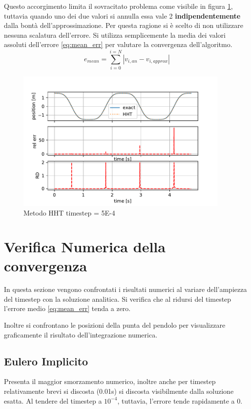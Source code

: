Questo accorgimento limita il sovracitato problema come visibile in figura \ref{fig:HHT_relerr}, tuttavia quando uno dei due valori si annulla essa vale 2 \textbf{indipendentemente} dalla bontà dell'approssimazione. Per questa ragione si è scelto di non utilizzare nessuna scalatura dell'errore. Si utilizza semplicemente la media dei valori assoluti dell'errore \ref{eq:mean_err} per valutare la convergenza dell'algoritmo.
\begin{equation}
    \label{eq:mean_err}
    e_{mean} = \sum_{i=0}^{i=N} |v_{i, an} - v_{i, approx}|
\end{equation}

\begin{figure}[h!]
\centering
\includegraphics[height=7cm]{Figure/HHT_relerr.pdf}
\caption{Metodo HHT timestep = 5E-4}
 \label{fig:HHT_relerr}
\end{figure}

\section{Verifica Numerica della convergenza}
In questa sezione vengono confrontati i risultati numerici al variare dell'ampiezza del timestep con la soluzione analitica. Si verifica che al ridursi del timestep l'errore medio \ref{eq:mean_err} tenda a zero.

Inoltre si confrontano le posizioni della punta del pendolo per visualizzare graficamente il risultato dell'integrazione numerica.
\subsection{Eulero Implicito}
Presenta il maggior smorzamento numerico, inoltre anche per timestep relativamente brevi si discosta (0.01s) si discosta visibilmente dalla soluzione esatta. 
Al tendere del timestep a $10^{-4}$, tuttavia, l'errore tende rapidamente a 0.


